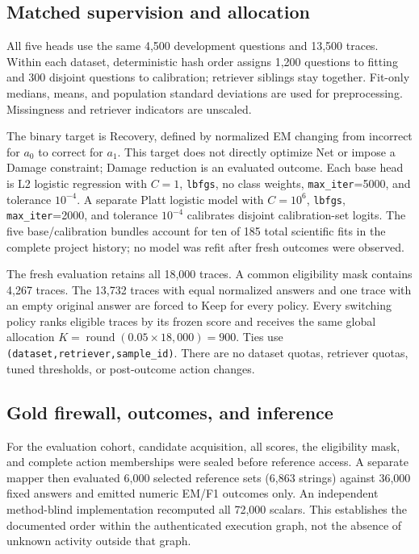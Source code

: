 \documentclass[11pt]{article}
\begin{document}
\subsection{Matched supervision and allocation}
All five heads use the same 4,500 development questions and 13,500 traces. Within each dataset, deterministic hash order assigns 1,200 questions to fitting and 300 disjoint questions to calibration; retriever siblings stay together. Fit-only medians, means, and population standard deviations are used for preprocessing. Missingness and retriever indicators are unscaled.

The binary target is Recovery, defined by normalized EM changing from incorrect for $a_0$ to correct for $a_1$. This target does not directly optimize Net or impose a Damage constraint; Damage reduction is an evaluated outcome. Each base head is L2 logistic regression with $C=1$, \texttt{lbfgs}, no class weights, \texttt{max\_iter}=5000, and tolerance $10^{-4}$. A separate Platt logistic model with $C=10^6$, \texttt{lbfgs}, \texttt{max\_iter}=2000, and tolerance $10^{-4}$ calibrates disjoint calibration-set logits. The five base/calibration bundles account for ten of 185 total scientific fits in the complete project history; no model was refit after fresh outcomes were observed.

The fresh evaluation retains all 18,000 traces. A common eligibility mask contains 4,267 traces. The 13,732 traces with equal normalized answers and one trace with an empty original answer are forced to Keep for every policy. Every switching policy ranks eligible traces by its frozen score and receives the same global allocation $K=\operatorname{round}(0.05\times18{,}000)=900$. Ties use \texttt{(dataset,retriever,sample\_id)}. There are no dataset quotas, retriever quotas, tuned thresholds, or post-outcome action changes.

\subsection{Gold firewall, outcomes, and inference}
For the evaluation cohort, candidate acquisition, all scores, the eligibility mask, and complete action memberships were sealed before reference access. A separate mapper then evaluated 6,000 selected reference sets (6,863 strings) against 36,000 fixed answers and emitted numeric EM/F1 outcomes only. An independent method-blind implementation recomputed all 72,000 scalars. This establishes the documented order within the authenticated execution graph, not the absence of unknown activity outside that graph.
\end{document}
